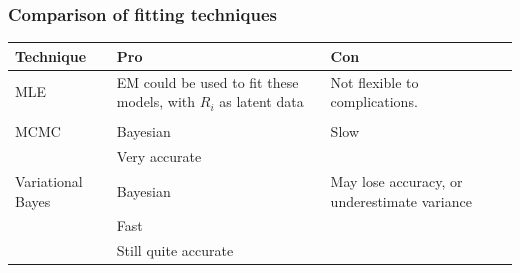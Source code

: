 \documentclass{beamer}
\begin{document}
\begin{frame}
	\frametitle{Comparison of fitting techniques}
	\begin{tabular}{p{2cm}p{3.5cm}p{4.5cm}}
		Technique         & Pro                                                             & Con                                          \\
		\hline
		MLE               & EM could be used to fit these models, with $R_i$ as latent data & Not flexible to complications.               \\
		                  &                                                                 &                                              \\ %
		\hline
		MCMC              & Bayesian                                                        & Slow                                         \\
		                  & Very accurate                                                   &                                              \\
		\hline
		Variational Bayes & Bayesian                                                        & May lose accuracy, or underestimate variance \\
		                  & Fast                                                            &                                              \\ %
		                  & Still quite accurate                                            &                                              \\
		\hline
	\end{tabular}
					
\end{frame}
\end{document}
